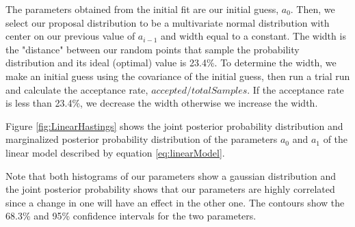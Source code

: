The parameters obtained from the initial fit are our initial guess, $a_0$. 
Then, we select our proposal distribution to be a multivariate normal distribution with center on our previous value of $a_{i-1}$ and width equal to a constant.
The width is the "distance" between our random points that sample the probability distribution and its ideal (optimal) value is 23.4\%.
To determine the width, we make an initial guess using the covariance of the initial guess, then run a trial run and calculate the acceptance rate, $accepted/totalSamples$.
If the acceptance rate is less than 23.4\%, we decrease the width otherwise we increase the width. 

Figure \ref{fig:LinearHastings} shows the joint posterior probability distribution and marginalized posterior probability distribution of the parameters $a_0$ and $a_1$ of the linear model described by equation \ref{eq:linearModel}. 

Note that both histograms of our parameters show a gaussian distribution and the joint posterior probability shows that our parameters are highly correlated since a change in one will have an effect in the other one. The contours show the 68.3\% and 95\% confidence intervals for the two parameters.


